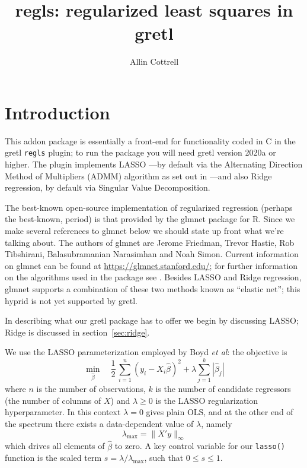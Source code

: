 \documentclass{article}
\title{regls: regularized least squares in gretl}
\author{Allin Cottrell}
\begin{document}
\maketitle

\section{Introduction}
\label{sec:intro}

This addon package is essentially a front-end for functionality coded
in C in the gretl \texttt{regls} plugin; to run the package you will
need gretl version 2020a or higher.  The plugin implements LASSO
\citep{tibshirani96}---by default via the Alternating Direction Method
of Multipliers (ADMM) algorithm as set out in \cite{boyd2010}---and
also Ridge regression, by default via Singular Value Decomposition.

The best-known open-source implementation of regularized regression
(perhaps the best-known, period) is that provided by the
\textsf{glmnet} package for \textsf{R}. Since we make several
references to \textsf{glmnet} below we should state up front what
we're talking about. The authors of \textsf{glmnet} are Jerome
Friedman, Trevor Hastie, Rob Tibshirani, Balasubramanian Narasimhan
and Noah Simon. Current information on \textsf{glmnet} can be found at
\url{https://glmnet.stanford.edu/}; for further information on the
algorithms used in the package see \cite{glmnet10}. Besides LASSO and
Ridge regression, \textsf{glmnet} supports a combination of these two
methods known as ``elastic net''; this hyprid is not yet supported by
gretl.

In describing what our gretl package has to offer we begin by
discussing LASSO; Ridge is discussed in section~\ref{sec:ridge}.

We use the LASSO parameterization employed by Boyd \textit{et al}: the
objective is
\begin{equation}
  \label{eq:obj}
  \min_{\hat{\beta}} \quad \frac{1}{2}\,
  \sum_{i=1}^n (y_i - X_i\hat{\beta})^2 + \lambda \sum_{j=1}^k |\hat{\beta}_j|
\end{equation}
where $n$ is the number of observations, $k$ is the number of
candidate regressors (the number of columns of $X$) and
$\lambda \geq 0$ is the LASSO regularization hyperparameter. In this
context $\lambda = 0$ gives plain OLS, and at the other end of the
spectrum there exists a data-dependent value of $\lambda$, namely
\begin{equation}
  \label{eq:lmax}
  \lambda_{\max} = \|X'y\|_{\infty}
\end{equation}
which drives all elements of $\hat{\beta}$ to zero.  A key control
variable for our \texttt{lasso()} function is the scaled term
$s = \lambda/\lambda_{\max}$, such that $0 \leq s \leq 1$.
\end{document}
